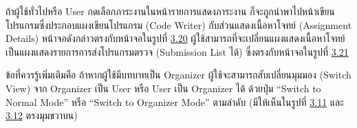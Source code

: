 \documentclass[12pt,oneside,openright,a4paper]{cpe-thai-project}
\begin{document}
        \begin{flushleft}
        ถ้าผู้ใช้ทั่วไปหรือ User กดเลือกภาระงานในหน้ารายการแสดงภาระงาน ก็จะถูกนำพาไปหน้าเขียนโปรแกรมซึ่งประกอบแผงเขียนโปรแกรม (Code Writer) กับส่วนแสดงเนื้อหาโจทย์ (Assignment Details) หน้าจอดังกล่าวตรงกับหน้าจอในรูปที่ \hyperlink{ui-code1}{3.20} ผู้ใช้สามารถที่จะเปลี่ยนแผงแสดงเนื้อหาโจทย์เป็นแผงแสดงรายการการส่งโปรแกรมตรวจ (Submission List ได้) ซึ่งตรงกับหน้าจอในรูปที่ \hyperlink{ui-code2}{3.21}
        \end{flushleft}
        \begin{flushleft}
        ข้อที่ควรรู้เพิ่มเติมคือ ถ้าหากผู้ใช้มีบทบาทเป็น Organizer ผู้ใช้จะสามารถสับเปลี่ยนมุมมอง (Switch View) จาก Organizer เป็น User หรือ User เป็น Organizer ได้ ด้วยปุ่ม “Switch to Normal Mode” หรือ “Switch to Organizer Mode” ตามลำดับ (มีให้เห็นในรูปที่ \hyperlink{ui-org-dashboard1}{3.11} และ \hyperlink{ui-assign1}{3.12} ตรงมุมขวาบน)
        \end{flushleft}
    \pagebreak
\newpage




\end{document}
